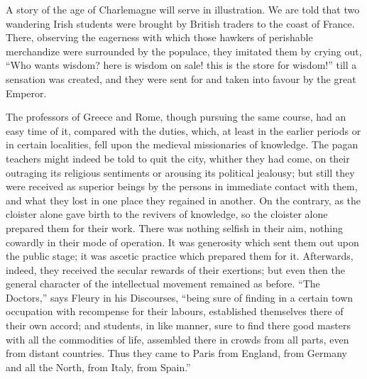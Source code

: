 A story of the age of
Charlemagne will serve in illustration. We are told that two wandering
Irish students were brought by British traders to the coast of France.
There, observing the eagerness with which those hawkers of perishable
merchandize were surrounded by the populace, they imitated them by
crying out, ``Who wants wisdom? here is wisdom on sale! this is the
store for wisdom!'' till a sensation was created, and they were sent
for and taken into favour by the great Emperor.

The professors of Greece and
Rome, though pursuing the same course, had an easy time of it,
compared with the duties, which, at least in the earlier periods or in
certain localities, fell upon the medieval missionaries of knowledge.
The pagan teachers might indeed be told to quit the city, whither they
had come, on their outraging its religious sentiments or arousing its
political jealousy; but still they were received as superior beings by
the persons in immediate contact with them, and what they lost in one
place they regained in another. On the contrary, as the cloister alone
gave birth to the revivers of knowledge, so the cloister alone
prepared them for their work. There was nothing selfish in their aim,
nothing cowardly in their mode of operation. It was generosity
which sent them out upon the public stage; it was ascetic practice
which prepared them for it. Afterwards, indeed, they received the
secular rewards of their exertions; but even then the general
character of the intellectual movement remained as before. ``The
Doctors,'' says Fleury in his Discourses, ``being sure of finding in
a certain town occupation with recompense for their labours,
established themselves there of their own accord; and students, in
like manner, sure to find there good masters with all the commodities
of life, assembled there in crowds from all parts, even from distant
countries. Thus they came to Paris from England, from Germany and all
the North, from Italy, from Spain.''

